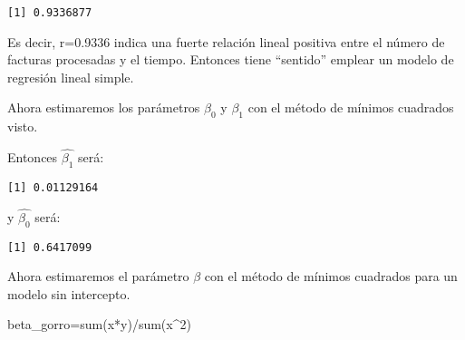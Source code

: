 \documentclass[
  a4paper,
  oneside,
  openany]{book}
\newenvironment{Shaded}{\begin{snugshade}}{\end{snugshade}}
\newcommand{\DecValTok}[1]{\textcolor[rgb]{0.00,0.00,0.81}{#1}}
\newcommand{\FunctionTok}[1]{\textcolor[rgb]{0.00,0.00,0.00}{#1}}
\newcommand{\NormalTok}[1]{#1}
\newcommand{\OtherTok}[1]{\textcolor[rgb]{0.56,0.35,0.01}{#1}}
\newcommand{\SpecialCharTok}[1]{\textcolor[rgb]{0.00,0.00,0.00}{#1}}
\begin{document}
\begin{verbatim}
[1] 0.9336877
\end{verbatim}

Es decir, r=0.9336 indica una fuerte relación lineal positiva entre el número de facturas procesadas y el tiempo. Entonces tiene ``sentido'' emplear un modelo de regresión lineal simple.

Ahora estimaremos los parámetros \(\beta_{0}\) y \(\beta_{1}\) con el método de mínimos cuadrados visto.

\begin{Shaded}
\end{Shaded}

Entonces \(\hat{\beta_{1}}\) será:

\begin{verbatim}
[1] 0.01129164
\end{verbatim}

y \(\hat{\beta_{0}}\) será:

\begin{verbatim}
[1] 0.6417099
\end{verbatim}

Ahora estimaremos el parámetro \(\beta\) con el método de mínimos cuadrados para un modelo sin intercepto.

\begin{Shaded}
\begin{Highlighting}[]
\NormalTok{beta\_gorro}\OtherTok{=}\FunctionTok{sum}\NormalTok{(x}\SpecialCharTok{*}\NormalTok{y)}\SpecialCharTok{/}\FunctionTok{sum}\NormalTok{(x}\SpecialCharTok{\^{}}\DecValTok{2}\NormalTok{)}
\end{Highlighting}
\end{Shaded}
\end{document}
